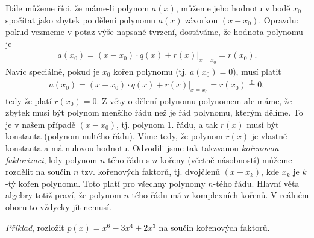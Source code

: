 \documentclass[11pt,a4paper]{article}
\begin{document}
            Dále můžeme říci, že máme-li polynom $a(x)$, můžeme jeho hodnotu v bodě $x_0$ spočítat jako zbytek po dělení polynomu $a(x)$ závorkou $(x-x_0)$. Opravdu: pokud vezmeme v potaz výše napsané tvrzení, dostáváme, že hodnota polynomu je
            \begin{align*}
                a(x_0) = (x-x_0) \cdot q(x) + r(x) \Big|_{x=x_0} = r(x_0).
            \end{align*}
            Navíc speciálně, pokud je $x_0$ kořen polynomu (tj. $a(x_0) = 0$), musí platit
            \begin{align*}
                a(x_0) = (x-x_0) \cdot q(x) + r(x) \Big|_{x=x_0} = r(x_0) \overset != 0,
            \end{align*}
            tedy že platí $r(x_0) = 0$. Z věty o dělení polynomu polynomem ale máme, že zbytek musí být polynom menšího řádu než je řád polynomu, kterým dělíme. To je v našem případě $(x-x_0)$, tj. polynom 1. řádu, a tak $r(x)$ musí být konstanta (polynom nultého řádu). Víme tedy, že polynom $r(x)$ je vlastně konstanta a má nulovou hodnotu. Odvodili jsme tak takzvanou \emph{kořenovou faktorizaci}, kdy polynom $n$-tého řádu s $n$ kořeny (včetně násobností) můžeme rozdělit na součin $n$ tzv. kořenových faktorů, tj. dvojčlenů $(x-x_k)$, kde $x_k$ je $k$-tý kořen polynomu. Toto platí pro všechny polynomy $n$-tého řádu. Hlavní věta algebry totiž praví, že polynom $n$-tého řádu má $n$ komplexních kořenů. V reálném oboru to vždycky jít nemusí.

            \noindent\emph{Příklad}, rozložit $p(x) = x^6 - 3x^4 + 2x^3$ na součin kořenových faktorů.
\end{document}
